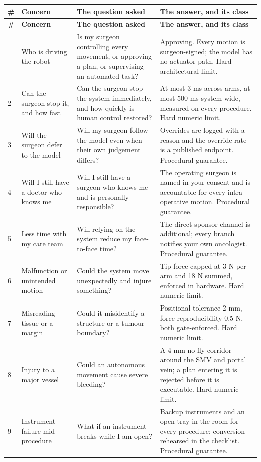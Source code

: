 \begin{xltabular}{\textwidth}{C{0.7cm} L{3.4cm} L{4.2cm} Y}
\toprule
\textbf{\#} & \textbf{Concern} & \textbf{The question asked} & \textbf{The answer, and its class} \\
\midrule
\endfirsthead
\toprule
\textbf{\#} & \textbf{Concern} & \textbf{The question asked} & \textbf{The answer, and its class} \\
\midrule
\endhead
\bottomrule
\endfoot
\bottomrule
{} & Who is driving the robot & Is my surgeon controlling every movement, or approving a plan, or supervising an automated task? & Approving. Every motion is surgeon-signed; the model has no actuator path. Hard architectural limit. \\
2 & Can the surgeon stop it, and how fast & Can the surgeon stop the system immediately, and how quickly is human control restored? & At most 3 ms across arms, at most 500 ms system-wide, measured on every procedure. Hard numeric limit. \\
3 & Will the surgeon defer to the model & Will my surgeon follow the model even when their own judgement differs? & Overrides are logged with a reason and the override rate is a published endpoint. Procedural guarantee. \\
4 & Will I still have a doctor who knows me & Will I still have a surgeon who knows me and is personally responsible? & The operating surgeon is named in your consent and is accountable for every intra-operative motion. Procedural guarantee. \\
5 & Less time with my care team & Will relying on the system reduce my face-to-face time? & The direct sponsor channel is additional; every branch notifies your own oncologist. Procedural guarantee. \\
6 & Malfunction or unintended motion & Could the system move unexpectedly and injure something? & Tip force capped at 3 N per arm and 18 N summed, enforced in hardware. Hard numeric limit. \\
7 & Misreading tissue or a margin & Could it misidentify a structure or a tumour boundary? & Positional tolerance 2 mm, force reproducibility 0.5 N, both gate-enforced. Hard numeric limit. \\
8 & Injury to a major vessel & Could an autonomous movement cause severe bleeding? & A 4 mm no-fly corridor around the SMV and portal vein; a plan entering it is rejected before it is executable. Hard numeric limit. \\
9 & Instrument failure mid-procedure & What if an instrument breaks while I am open? & Backup instruments and an open tray in the room for every procedure; conversion rehearsed in the checklist. Procedural guarantee. \\

\end{xltabular}

